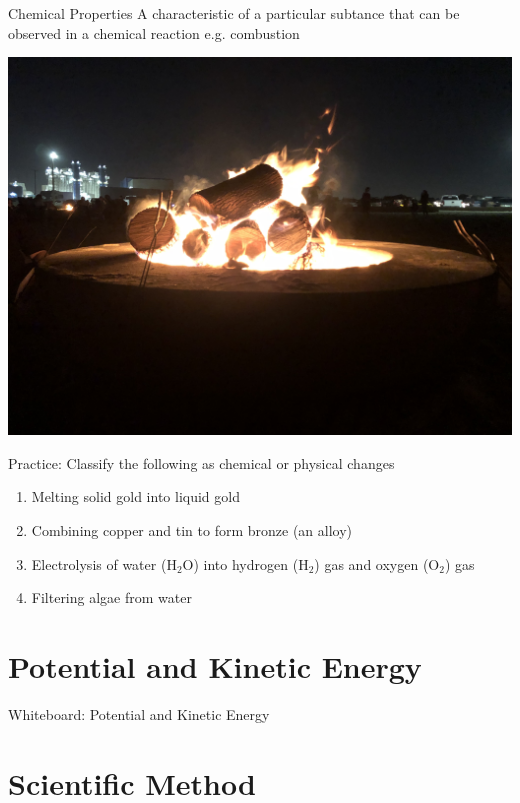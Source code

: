 \documentclass[11pt]{beamer}
\begin{document}
\begin{frame}{Chemical Properties}
  A characteristic of a particular subtance that can be observed
  in a chemical reaction e.g. combustion

  \centering
  \includegraphics[scale=0.05]{bonfire}
\end{frame}

\begin{frame}{Practice: Classify the following as chemical or physical changes}
  \begin{enumerate}
  \item Melting solid gold into liquid gold
  \item Combining copper and tin to form bronze (an alloy)
  \item Electrolysis of water (H$_2$O) into hydrogen (H$_2$) gas and oxygen (O$_2$)
    gas
  \item Filtering algae from water
  \end{enumerate}
\end{frame}

\section{Potential and Kinetic Energy}

\begin{frame}{Whiteboard: Potential and Kinetic Energy}
\end{frame}

\section{Scientific Method}
\end{document}
